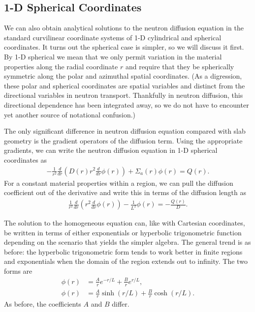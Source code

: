 \subsection{1-D Spherical Coordinates}

We can also obtain analytical solutions to the neutron diffusion equation in the standard curvilinear coordinate systems of 1-D cylindrical and spherical coordinates. It turns out the spherical case is simpler, so we will discuss it first. By 1-D spherical we mean that we only permit variation in the material properties along the radial coordinate $r$ and require that they be spherically symmetric along the polar and azimuthal spatial coordinates. (As a digression, these polar and spherical coordinates are spatial variables and distinct from the directional variables in neutron transport. Thankfully in neutron diffusion, this directional dependence has been integrated away, so we do not have to encounter yet another source of notational confusion.)

The only significant difference in neutron diffusion equation compared with slab geometry is the gradient operators of the diffusion term. Using the appropriate gradients, we can write the neutron diffusion equation in 1-D spherical coordinates as
\begin{align}
  - \frac{1}{r^2} \frac{d}{dr} \left( D(r) r^2 \frac{d}{dr} \phi(r) \right) + \Sigma_a(r) \phi(r) = Q(r).
\end{align}
For a constant material properties within a region, we can pull the diffusion coefficient out of the derivative and write this in terms of the diffusion length as
\begin{align}
  \frac{1}{r^2} \frac{d}{dr} \left( r^2 \frac{d}{dr}  \phi(r) \right) - \frac{1}{L^2} \phi(r) = -\frac{Q(r)}{D}.
\end{align}

The solution to the homogeneous equation can, like with Cartesian coordinates, be written in terms of either exponentials or hyperbolic trigonometric function depending on the scenario that yields the simpler algebra. The general trend is as before: the hyperbolic trigonometric form tends to work better in finite regions and exponentials when the domain of the region extends out to infinity. The two forms are
\begin{subequations}
\begin{align}
  \phi(r) &= \frac{A}{r} e^{-r/L} + \frac{B}{r} e^{r/L}, \label{Eq:neutronics_diffusionHomogeneous_1DPlanarExponential} \\
  \phi(r) &= \frac{A}{r} \sinh(r/L) + \frac{B}{r} \cosh(r/L). \label{Eq:neutronics_diffusionHomogeneous_1DPlanarHyperbolic}
\end{align}
\end{subequations}
As before, the coefficients $A$ and $B$ differ.

